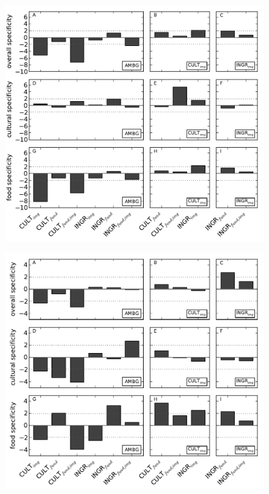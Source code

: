 \documentclass[a4paper]{report}
\begin{document}
\begin{figure}
	\includegraphics[]{../specificity-test3.pdf}
\end{figure}

\begin{figure}
	\includegraphics[]{../specificity-test4.pdf}
\end{figure}
\end{document}
